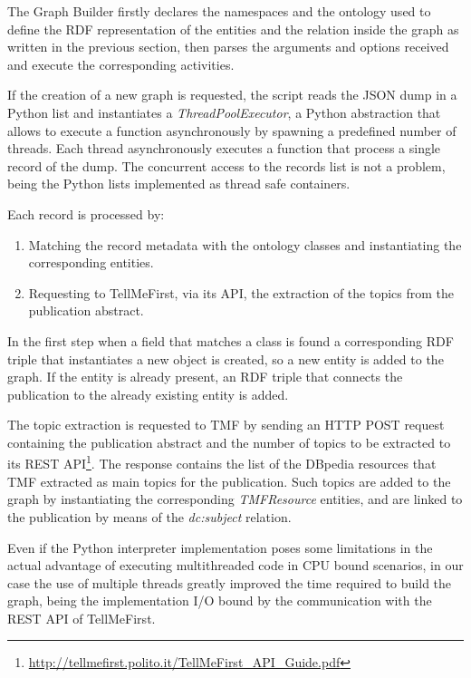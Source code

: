 \documentclass[%
    corpo=13.5pt,
    twoside,
    oldstyle,
    tipotesi=magistrale,
    greek,
    evenboxes
]{toptesi}
\begin{document}
The Graph Builder firstly declares the namespaces and the ontology used to
define the RDF representation of the entities and the relation inside the graph
as written in the previous section, then parses the arguments and options
received and execute the corresponding activities.

If the creation of a new graph is requested, the script reads the JSON dump
in a Python list and instantiates a \emph{ThreadPoolExecutor}, a Python
abstraction that allows to execute a function asynchronously by spawning
a predefined number of threads.
Each thread asynchronously executes a function that process a single record of
the dump.
The concurrent access to the records list is not a problem, being the Python
lists implemented as thread safe containers.

Each record is processed by:

\begin{enumerate}
    \item Matching the record metadata with the ontology classes and
        instantiating the corresponding entities.
    \item Requesting to TellMeFirst, via its API, the extraction of the topics
        from the publication abstract.
\end{enumerate}

In the first step when a field that matches a class is found a corresponding
RDF triple that instantiates a new object is created, so a new entity is added
to the graph. If the entity is already present, an RDF triple that connects the
publication to the already existing entity is added.

The topic extraction is requested to TMF by sending an HTTP POST request
containing the publication abstract and the number of topics to be extracted
to its REST API\footnote{\url{http://tellmefirst.polito.it/TellMeFirst_API_Guide.pdf}}.
The response contains the list of the DBpedia resources that TMF
extracted as main topics for the publication. Such topics are added to the
graph by instantiating the corresponding \emph{TMFResource} entities, and are
linked to the publication by means of the \emph{dc:subject} relation.

Even if the Python interpreter implementation poses some limitations in the
actual advantage of executing multithreaded code in CPU bound scenarios, in our
case the use of multiple threads greatly improved the time required to build
the graph, being the implementation I/O bound by the communication with the
REST API of TellMeFirst.
\end{document}
